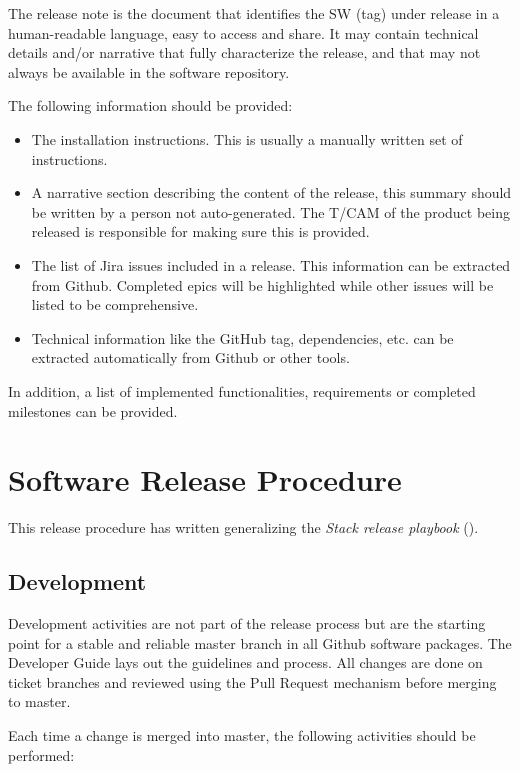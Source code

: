 The release note is the document that identifies the SW (tag) under release in a human-readable language, easy to access and share. 
It may contain technical details and/or narrative that fully characterize the release, and that may not always be available in the software repository.

The following information should be provided:
\begin{itemize}
\item The installation instructions. This is usually a manually written set of instructions. 
\item A narrative section describing the content of the release, this summary should be written by a person not auto-generated.
The T/CAM of the product being released is responsible for making sure this is provided.
\item The list of Jira issues included in a release. This information can be extracted from Github. 
Completed epics will be highlighted while other issues will be listed to be comprehensive.
\item Technical information like the GitHub tag, dependencies, etc. can be extracted automatically from Github or other tools.
\end{itemize}

In addition, a list of implemented functionalities, requirements or completed milestones can be provided.


\newpage
\section{Software Release Procedure} \label{sec:releaseprocedure}

This release procedure has written generalizing the \textit{Stack release playbook} ().

\subsection{Development} \label{sec:dev}

Development activities are not part of the release process but are the starting point for a stable and reliable master branch in all Github software packages.
The Developer Guide lays out the guidelines and process. All changes are done on ticket branches and reviewed using the Pull Request mechanism before merging to master.

Each time a change is merged into master, the following activities should be performed:

